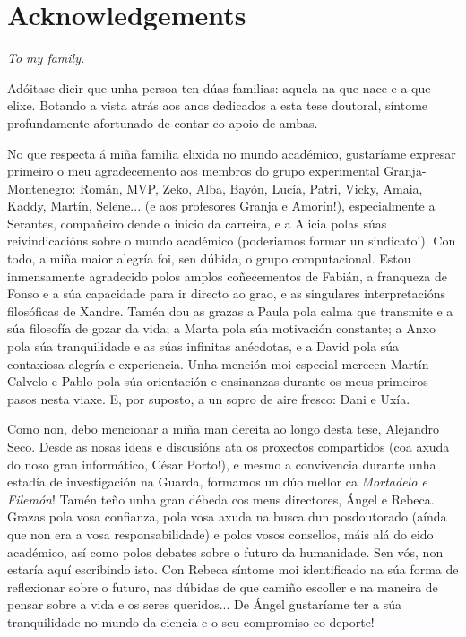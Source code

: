 \thispagestyle{plain}
\newpage
\section*{Acknowledgements}

\textit{To my family.}

\vspace{0.5cm}

Adóitase dicir que unha persoa ten dúas familias: aquela na que nace e a que elixe. Botando a vista atrás aos anos dedicados a esta tese doutoral, síntome profundamente afortunado de contar co apoio de ambas.

No que respecta á miña familia elixida no mundo académico, gustaríame expresar primeiro o meu agradecemento aos membros do grupo experimental Granja-Montenegro: Román, MVP, Zeko, Alba, Bayón, Lucía, Patri, Vicky, Amaia, Kaddy, Martín, Selene... (e aos profesores Granja e Amorín!), especialmente a Serantes, compañeiro dende o inicio da carreira, e a Alicia polas súas reivindicacións sobre o mundo académico (poderiamos formar un sindicato!). Con todo, a miña maior alegría foi, sen dúbida, o grupo computacional. Estou inmensamente agradecido polos amplos coñecementos de Fabián, a franqueza de Fonso e a súa capacidade para ir directo ao grao, e as singulares interpretacións filosóficas de Xandre. Tamén dou as grazas a Paula pola calma que transmite e a súa filosofía de gozar da vida; a Marta pola súa motivación constante; a Anxo pola súa tranquilidade e as súas infinitas anécdotas, e a David pola súa contaxiosa alegría e experiencia. Unha mención moi especial merecen Martín Calvelo e Pablo pola súa orientación e ensinanzas durante os meus primeiros pasos nesta viaxe. E, por suposto, a un sopro de aire fresco: Dani e Uxía.

Como non, debo mencionar a miña man dereita ao longo desta tese, Alejandro Seco. Desde as nosas ideas e discusións ata os proxectos compartidos (coa axuda do noso gran informático, César Porto!), e mesmo a convivencia durante unha estadía de investigación na Guarda, formamos un dúo mellor ca \textit{Mortadelo e Filemón}! Tamén teño unha gran débeda cos meus directores, Ángel e Rebeca. Grazas pola vosa confianza, pola vosa axuda na busca dun posdoutorado (aínda que non era a vosa responsabilidade) e polos vosos consellos, máis alá do eido académico, así como polos debates sobre o futuro da humanidade. Sen vós, non estaría aquí escribindo isto. Con Rebeca síntome moi identificado na súa forma de reflexionar sobre o futuro, nas dúbidas de que camiño escoller e na maneira de pensar sobre a vida e os seres queridos... De Ángel gustaríame ter a súa tranquilidade no mundo da ciencia e o seu compromiso co deporte!

